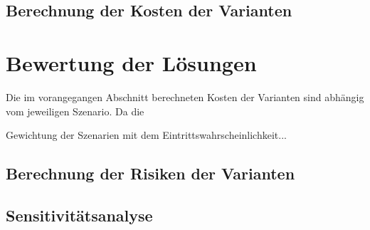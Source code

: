 	\subsection{Berechnung der Kosten der Varianten}
	\label{subsec:Kostenberechnung}
	


\section{Bewertung der Lösungen}
\label{sec:Bewertung}

Die im vorangegangen Abschnitt berechneten Kosten der Varianten sind abhängig vom jeweiligen Szenario. Da die 

Gewichtung der Szenarien mit dem Eintrittswahrscheinlichkeit...

	\subsection{Berechnung der Risiken der Varianten}
	



	\subsection{Sensitivitätsanalyse}
	

%

